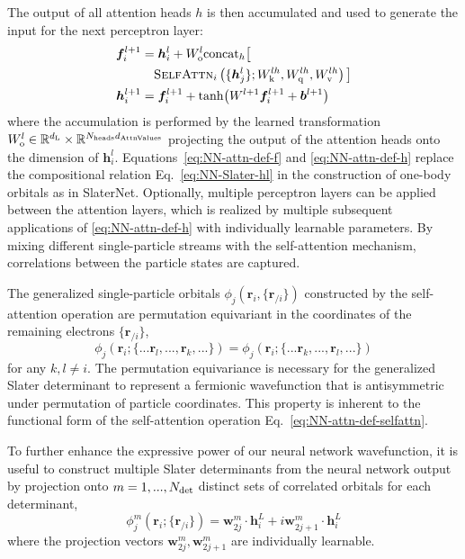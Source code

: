\documentclass[
 reprint,
 amsmath,amssymb,
 aps, prx,
floatfix,longbibliography,
]{revtex4-2}
\begin{document}
The output of all attention heads $h$ is then accumulated and used to generate the input for the next perceptron layer: 
\begin{align}
    \bm f_i^{l+1} & = \bm h_i^l + W_{\rm o}^l {\rm {concat}}_h \big[ \nonumber \\ 
    & \quad {\rm \textsc{SelfAttn}}_i\left( \{ \bm h_j^l \}; W_{\rm k}^{lh},W_{\rm q}^{lh}, W_{\rm v}^{lh} \right)
 \big] \label{eq:NN-attn-def-f} \\
 \bm h^{l + 1}_i & = \bm f^{l+1}_i +  \tanh (W^{l+1} \bm f^{l+1}_i + \bm b^{l+1}) \label{eq:NN-attn-def-h}
\end{align}
where the accumulation is performed by the learned transformation $W_{\rm o}^l \in \mathbb{R}^{d_{\rm L}} \times \mathbb{R}^{N_{\rm heads} d_{\rm AttnValues}}$ projecting the output of the attention heads onto the dimension of $\bm h_i^l$. 
Equations~\eqref{eq:NN-attn-def-f} and \eqref{eq:NN-attn-def-h} replace the compositional relation Eq.~\eqref{eq:NN-Slater-hl} in the construction of one-body orbitals as in SlaterNet. 
Optionally, multiple perceptron layers can be applied between the attention layers, which is realized by multiple subsequent applications of \eqref{eq:NN-attn-def-h} with individually learnable parameters.
By mixing different single-particle streams with the self-attention mechanism, correlations between the particle states are captured. 



The generalized single-particle orbitals $\phi_j(\bm r_i, \{ \bm r_{/i}\})$ constructed by the self-attention operation are permutation equivariant in the coordinates of the remaining electrons $\{ \bm r_{/i}\}$,
\begin{equation}
    \phi_j(\bm r_i;  \{ ... \bm r_l, ..., \bm r_k, ... \}) = \phi_j(\bm r_i; \{ ... \bm r_k, ..., \bm r_l, ... \})
\end{equation}
for any $k,l \neq i$. The permutation equivariance is necessary for the generalized Slater determinant to represent a fermionic wavefunction that is antisymmetric under permutation of particle coordinates. 
This property is inherent to the functional form of the self-attention operation Eq.~\eqref{eq:NN-attn-def-selfattn}. 



To further enhance the expressive power of our neural network wavefunction, it is useful to construct multiple Slater determinants from the neural network output by projection onto $m = 1, ..., N_{\rm det}$ distinct sets of correlated 
orbitals for each determinant,
\begin{equation}
    \phi_j^m(\bm r_i; \{\bm r_{/i}\}) = \bm w_{2j}^m \cdot \bm h^{L}_i + i \bm w_{2j+1}^m \cdot \bm h^{L}_i
    \label{eq:NN-attn-phi}
\end{equation} 
where the projection vectors $\bm w_{2j}^m, \bm w_{2j+1}^m$ %
are individually learnable. 
\end{document}

